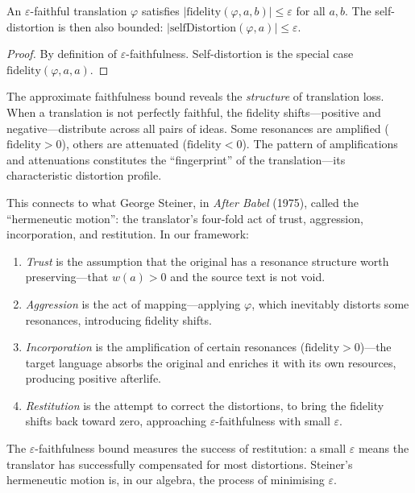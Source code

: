 \begin{theorem}
\label{thm:approx-faithful}
An $\varepsilon$-faithful translation $\varphi$ satisfies $|\mathrm{fidelity}(\varphi, a, b)| \leq \varepsilon$ for all $a, b$.  The self-distortion is then also bounded: $|\mathrm{selfDistortion}(\varphi, a)| \leq \varepsilon$.
\end{theorem}

\begin{proof}
By definition of $\varepsilon$-faithfulness.  Self-distortion is the special case $\mathrm{fidelity}(\varphi, a, a)$.
\end{proof}

\begin{interpretation}
\label{interp:architecture-loss}
The approximate faithfulness bound reveals the \emph{structure} of translation loss.  When a translation is not perfectly faithful, the fidelity shifts---positive and negative---distribute across all pairs of ideas.  Some resonances are amplified ($\mathrm{fidelity} > 0$), others are attenuated ($\mathrm{fidelity} < 0$).  The pattern of amplifications and attenuations constitutes the ``fingerprint'' of the translation---its characteristic distortion profile.

This connects to what George Steiner, in \textit{After Babel} (1975), called the ``hermeneutic motion'': the translator's four-fold act of trust, aggression, incorporation, and restitution.  In our framework:
\begin{enumerate}
\item \emph{Trust} is the assumption that the original has a resonance structure worth preserving---that $w(a) > 0$ and the source text is not void.
\item \emph{Aggression} is the act of mapping---applying $\varphi$, which inevitably distorts some resonances, introducing fidelity shifts.
\item \emph{Incorporation} is the amplification of certain resonances ($\mathrm{fidelity} > 0$)---the target language absorbs the original and enriches it with its own resources, producing positive afterlife.
\item \emph{Restitution} is the attempt to correct the distortions, to bring the fidelity shifts back toward zero, approaching $\varepsilon$-faithfulness with small $\varepsilon$.
\end{enumerate}
The $\varepsilon$-faithfulness bound measures the success of restitution: a small $\varepsilon$ means the translator has successfully compensated for most distortions.  Steiner's hermeneutic motion is, in our algebra, the process of minimising $\varepsilon$.
\end{interpretation}

